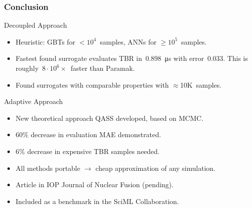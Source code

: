 \begin{frame}
	\frametitle{Conclusion}

	\begin{block}{Decoupled Approach}
		\begin{itemize}
			\item
				Heuristic: \alert{GBTs} for $<10^4$~samples,
				\alert{ANNs} for $\geq10^5$~samples.
			\item
				Fastest found surrogate evaluates TBR in~\SI{0.898}{\micro\second}
				with error~$\num{0.033}$. This is roughly~\alert{$8\cdot
				10^6\times$~faster} than Paramak.
			\item
				Found surrogates with comparable properties with
				\alert{$\approx$10K~samples}.
		\end{itemize}
	\end{block}

	\begin{block}{Adaptive Approach}
		\begin{itemize}
			\item
				New theoretical approach QASS developed, based on MCMC.
			\item 
				\alert{$60\%$ decrease} in evaluation MAE demonstrated.
			\item
				\alert{$6\%$ decrease} in expensive TBR samples needed.
		\end{itemize}
	\end{block}

	\begin{itemize}
		\item 
			All methods \alert{portable} $\rightarrow$ cheap approximation of any simulation.
		\item
			Article in IOP \alert{Journal of Nuclear Fusion} (pending).
		\item
			Included as a benchmark in the \alert{SciML Collaboration}.
	\end{itemize}

\end{frame}

